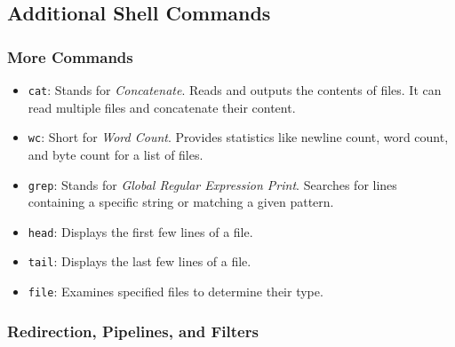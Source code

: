 \subsection{Additional Shell Commands}

\subsubsection{More Commands}

\begin{itemize}
    \item \texttt{cat}: Stands for \textit{Concatenate}. Reads and outputs the contents of files. It can read multiple files and concatenate their content.
    \item \texttt{wc}: Short for \textit{Word Count}. Provides statistics like newline count, word count, and byte count for a list of files.
    \item \texttt{grep}: Stands for \textit{Global Regular Expression Print}. Searches for lines containing a specific string or matching a given pattern.
    \item \texttt{head}: Displays the first few lines of a file.
    \item \texttt{tail}: Displays the last few lines of a file.
    \item \texttt{file}: Examines specified files to determine their type.
\end{itemize}

\subsubsection{Redirection, Pipelines, and Filters}

